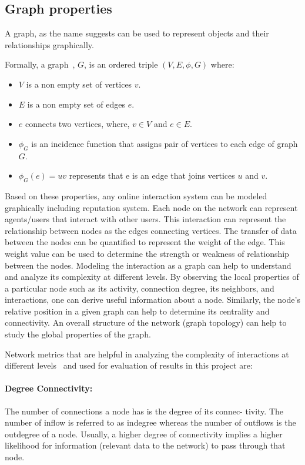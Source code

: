 \subsection{Graph properties}
A graph, as the name suggests can be used to represent objects and their
relationships graphically. \par
Formally, a graph~\cite{bondy1976graph}, $G$, is an ordered triple $(V,E,\phi,
G)$ where:
\begin{itemize}
	\item $V$ is a non empty set of vertices $v$.
	\item $E$ is a non empty set of edges $e$.
	\item $e$ connects two vertices, where, $v \in V$ and $e \in E$.
	\item $\phi_G$ is an incidence function that assigns pair of vertices to
		each edge of graph $G$. 
	\item $\phi_G(e) = uv$ represents that e is an edge that joins vertices $u$
		and $v$.
\end{itemize}
Based on these properties, any online interaction system can be modeled
graphically including reputation system. Each node on the network can represent
agents/users that interact with other users. This interaction can represent the
relationship between nodes as the edges connecting vertices. The transfer of
data between the nodes can be quantified to represent the weight of the edge.
This weight value can be used to determine the strength or weakness of
relationship between the nodes. Modeling the interaction as a graph can help to
understand and analyze its complexity at different levels. By observing the
local properties of a particular node such as its activity, connection degree,
its neighbors, and interactions, one can derive useful information about a
node. Similarly, the node’s relative position in a given graph can help to
determine its centrality and connectivity. An overall structure of the network
(graph topology) can help to study the global properties of the graph. \par
Network metrics that are helpful in analyzing the complexity of interactions at
different levels~\cite{gkorou2014exploiting} and used for evaluation of results
in this project are:
\paragraph{Degree Connectivity:} The number of connections a node has is the
degree of its connec- tivity. The number of inflow is referred to as indegree
whereas the number of outflows is the outdegree of a node. Usually, a higher
degree of connectivity implies a higher likelihood for information (relevant
data to the network) to pass through that node.  

